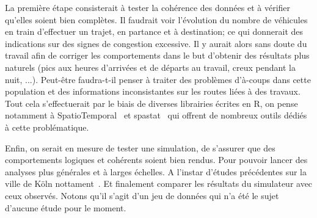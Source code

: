 La première étape consisterait à tester la cohérence des données et à vérifier qu'elles soient bien complètes. Il faudrait voir l'évolution du nombre de véhicules en train d'effectuer un trajet, en partance et à destination; ce qui donnerait des indications sur des signes de congestion excessive. Il y aurait alors sans doute du travail afin de corriger les comportements dans le but d'obtenir des résultats plus naturels (pics aux heures d'arrivées et de départs au travail, creux pendant la nuit, ...). Peut-être faudra-t-il penser à traiter des problèmes d'à-coups dans cette population et des informations inconsistantes sur les routes liées à des travaux. Tout cela s'effectuerait par le biais de diverses librairies écrites en R, on pense notamment à SpatioTemporal~\cite{keller2015unified} et spastat~\cite{baddeley2016spatial} qui offrent de nombreux outils dédiés à cette problématique.

Enfin, on serait en mesure de tester une simulation, de s'assurer que des comportements logiques et cohérents soient bien rendus. Pour pouvoir lancer des analyses plus générales et à larges échelles. A l'instar d'études précédentes sur la ville de Köln nottament~\cite{uppoor2011large, uppoor2012insights}. Et finalement comparer les résultats du simulateur avec ceux observés. Notons qu'il s'agit d'un jeu de données qui n'a été le sujet d'aucune étude pour le moment.